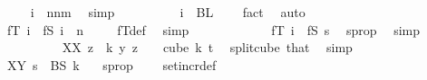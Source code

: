 \begin{isabellebody}
\ \isamarkupfalse%
\ {\isacharasterisk}{\kern0pt}{\isacharcolon}{\kern0pt}\ {\isachardoublequoteopen}\ i\ {\isasymin}\ {\isacharbraceleft}{\kern0pt}n{\isachardot}{\kern0pt}{\isachardot}{\kern0pt}{\isacharless}{\kern0pt}n{\isacharplus}{\kern0pt}m{\isacharbraceright}{\kern0pt}{\isachardoublequoteclose}\ \isamarkupfalse%
\ simp\isanewline
\ \ \ \ \ \ \ \ \isamarkupfalse%
\ {\isachardoublequoteopen}i\ {\isasymnotin}\ BL\ {}{\isachardoublequoteclose}\ \isamarkupfalse%
\ {}\ fact{}\ \isamarkupfalse%
\ auto\isanewline
\ \ \ \ \ \ \ \ \isamarkupfalse%
\ \isamarkupfalse%
\ {\isachardoublequoteopen}fT\ i\ {\isacharequal}{\kern0pt}\ fS\ {\isacharparenleft}{\kern0pt}i\ {\isacharminus}{\kern0pt}\ n{\isacharparenright}{\kern0pt}{\isachardoublequoteclose}\ \isamarkupfalse%
\ {}\ \isamarkupfalse%
\ fT{\isacharunderscore}{\kern0pt}def\ \isamarkupfalse%
\ simp\isanewline
\ \ \ \ \ \ \ \ \isamarkupfalse%
\ \isamarkupfalse%
\ {\isacharasterisk}{\kern0pt}{\isacharasterisk}{\kern0pt}{\isacharcolon}{\kern0pt}\ {\isachardoublequoteopen}fT\ i\ {\isacharequal}{\kern0pt}\ fS\ s{\isachardoublequoteclose}\ \isamarkupfalse%
\ s{\isacharunderscore}{\kern0pt}prop\ \isamarkupfalse%
\ simp\isanewline
\isanewline
\ \ \ \ \ \ \ \ \isamarkupfalse%
\ XX{\isacharcolon}{\kern0pt}\ {\isachardoublequoteopen}{\isacharparenleft}{\kern0pt}{\isasymlambda}z\ {\isasymin}\ {\isacharbraceleft}{\kern0pt}{\isachardot}{\kern0pt}{\isachardot}{\kern0pt}{\isacharless}{\kern0pt}k{\isacharbraceright}{\kern0pt}{\isachardot}{\kern0pt}\ y\ {\isacharparenleft}{\kern0pt}z\ {\isacharplus}{\kern0pt}\ {}{\isacharparenright}{\kern0pt}{\isacharparenright}{\kern0pt}\ {\isasymin}\ cube\ k\ {\isacharparenleft}{\kern0pt}t{\isacharplus}{\kern0pt}{}{\isacharparenright}{\kern0pt}{\isachardoublequoteclose}\ \isamarkupfalse%
\ split{\isacharunderscore}{\kern0pt}cube\ that\ \isamarkupfalse%
\ simp\isanewline
\ \ \ \ \ \ \ \ \isamarkupfalse%
\ XY{\isacharcolon}{\kern0pt}\ {\isachardoublequoteopen}s\ {\isasymin}\ BS\ k{\isachardoublequoteclose}\ \isamarkupfalse%
\ \ s{\isacharunderscore}{\kern0pt}prop\ \ {}\ \isamarkupfalse%
\ set{\isacharunderscore}{\kern0pt}incr{\isacharunderscore}{\kern0pt}def\ \isamarkupfalse%

\end{isabellebody}
